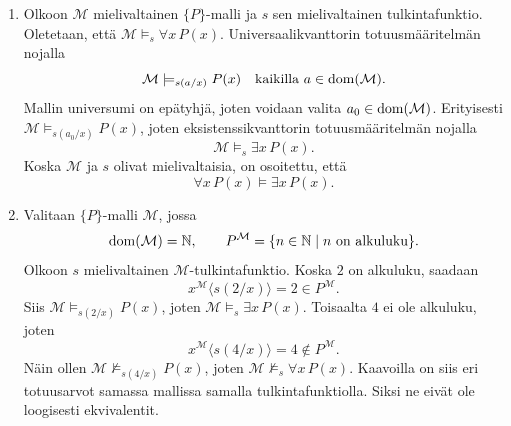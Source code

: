 \documentclass[11pt,a4paper]{amsart}
\begin{document}
\begin{solution}
  \leavevmode\par
  \begin{enumerate}[label=(\alph*)]
    \item Olkoon \(\mathcal M\) mielivaltainen \(\{P\}\)-malli ja
      \(s\) sen mielivaltainen tulkintafunktio. Oletetaan, että
      \(\mathcal M\models_s\forall x\,P(x)\).
      Universaalikvanttorin totuusmääritelmän nojalla
      \[
        \mathcal M\models_{s(a/x)}P(x)
        \quad\text{kaikilla }a\in\operatorname{dom}(\mathcal M).
      \]
      Mallin universumi on epätyhjä, joten voidaan valita
      \(a_0\in\operatorname{dom}(\mathcal M)\). Erityisesti
      \(\mathcal M\models_{s(a_0/x)}P(x)\), joten
      eksistenssikvanttorin totuusmääritelmän nojalla
      \[
        \mathcal M\models_s\exists x\,P(x).
      \]
      Koska \(\mathcal M\) ja \(s\) olivat mielivaltaisia, on osoitettu,
      että
      \[
        \forall x\,P(x)\models\exists x\,P(x).
      \]

    \item Valitaan \(\{P\}\)-malli \(\mathcal M\), jossa
      \[
        \operatorname{dom}(\mathcal M)=\mathbb{N},
        \qquad
        P^{\mathcal M}=\{n\in\mathbb{N}\mid n\text{ on alkuluku}\}.
      \]
      Olkoon \(s\) mielivaltainen \(\mathcal M\)-tulkintafunktio.
      Koska \(2\) on alkuluku, saadaan
      \[
        x^{\mathcal M}\langle s(2/x)\rangle
        =2\in P^{\mathcal M}.
      \]
      Siis \(\mathcal M\models_{s(2/x)}P(x)\), joten
      \(\mathcal M\models_s\exists x\,P(x)\).
      Toisaalta \(4\) ei ole alkuluku, joten
      \[
        x^{\mathcal M}\langle s(4/x)\rangle
        =4\notin P^{\mathcal M}.
      \]
      Näin ollen \(\mathcal M\not\models_{s(4/x)}P(x)\), joten
      \(\mathcal M\not\models_s\forall x\,P(x)\).
      Kaavoilla on siis eri totuusarvot samassa mallissa samalla
      tulkintafunktiolla. Siksi ne eivät ole loogisesti
      ekvivalentit.\qedhere
  \end{enumerate}
\end{solution}
\end{document}
